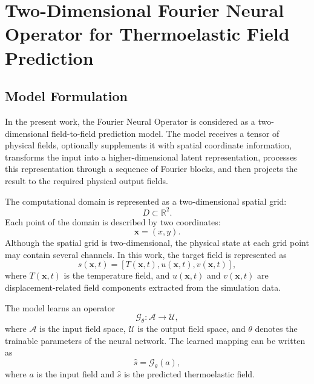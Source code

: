 \section{Two-Dimensional Fourier Neural Operator for Thermoelastic Field Prediction}

\subsection{Model Formulation}

In the present work, the Fourier Neural Operator is considered as a two-dimensional field-to-field prediction model. The model receives a tensor of physical fields, optionally supplements it with spatial coordinate information, transforms the input into a higher-dimensional latent representation, processes this representation through a sequence of Fourier blocks, and then projects the result to the required physical output fields.

The computational domain is represented as a two-dimensional spatial grid:
\begin{equation}
D \subset \mathbb{R}^{2}.
\end{equation}
Each point of the domain is described by two coordinates:
\begin{equation}
\boldsymbol{x} = (x,y).
\end{equation}
Although the spatial grid is two-dimensional, the physical state at each grid point may contain several channels. In this work, the target field is represented as
\begin{equation}
s(\boldsymbol{x}, t)
=
\left[
T(\boldsymbol{x}, t),
u(\boldsymbol{x}, t),
v(\boldsymbol{x}, t)
\right],
\end{equation}
where \(T(\boldsymbol{x}, t)\) is the temperature field, and \(u(\boldsymbol{x}, t)\) and \(v(\boldsymbol{x}, t)\) are displacement-related field components extracted from the simulation data.

The model learns an operator
\begin{equation}
\mathcal{G}_{\theta}: \mathcal{A} \rightarrow \mathcal{U},
\end{equation}
where \(\mathcal{A}\) is the input field space, \(\mathcal{U}\) is the output field space, and \(\theta\) denotes the trainable parameters of the neural network. The learned mapping can be written as
\begin{equation}
\hat{s}
=
\mathcal{G}_{\theta}(a),
\end{equation}
where \(a\) is the input field and \(\hat{s}\) is the predicted thermoelastic field.

